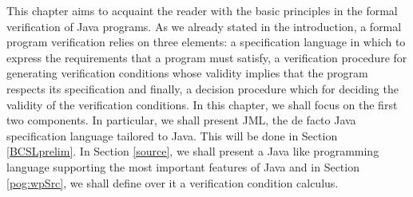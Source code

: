 This chapter aims to acquaint the reader with  the basic principles in the formal verification  
of Java programs. As we already stated in the introduction, a formal program verification
relies on three elements: a specification language in which to express the requirements 
that a program must satisfy, a verification procedure for generating verification conditions
whose validity implies that the program respects its specification and finally,
 a decision procedure which for deciding the validity of the verification conditions.
In this chapter, we shall focus on the first two components. 
In particular, we shall present JML,
the de facto Java specification language  tailored to Java. This will be done in Section \ref{BCSLprelim}.
In Section \ref{source}, we shall present a Java like programming language supporting the most important features of Java
 and in Section \ref{pog:wpSrc}, we shall define over it a  verification condition calculus.

